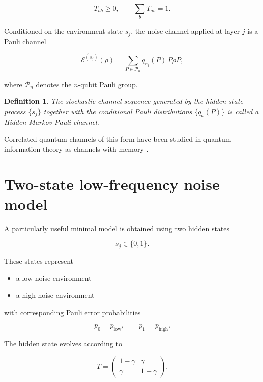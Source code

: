 \documentclass[11pt]{article}
\newtheorem{definition}{Definition}
\begin{document}
\begin{equation}
T_{ab}\ge0, \qquad \sum_b T_{ab}=1.
\end{equation}

Conditioned on the environment state $s_j$, the noise channel applied at layer $j$ is a Pauli channel

\begin{equation}
\mathcal{E}^{(s_j)}(\rho)
= \sum_{P\in\mathcal{P}_n} q_{s_j}(P)\,P\rho P ,
\end{equation}

where $\mathcal{P}_n$ denotes the $n$-qubit Pauli group.

\begin{definition}
The stochastic channel sequence generated by the hidden state process $\{s_j\}$ together with the conditional Pauli distributions $\{q_a(P)\}$ is called a Hidden Markov Pauli channel.
\end{definition}

Correlated quantum channels of this form have been studied in quantum information theory as channels with memory \cite{macchiavello2002}.

\section{Two-state low-frequency noise model}

A particularly useful minimal model is obtained using two hidden states

\begin{equation}
s_j \in \{0,1\}.
\end{equation}

These states represent

\begin{itemize}
\item a low-noise environment
\item a high-noise environment
\end{itemize}

with corresponding Pauli error probabilities

\begin{equation}
p_0 = p_{\mathrm{low}}, \qquad p_1 = p_{\mathrm{high}}.
\end{equation}

The hidden state evolves according to

\begin{equation}
T =
\begin{pmatrix}
1-\gamma & \gamma \\
\gamma & 1-\gamma
\end{pmatrix}.
\end{equation}
\end{document}
